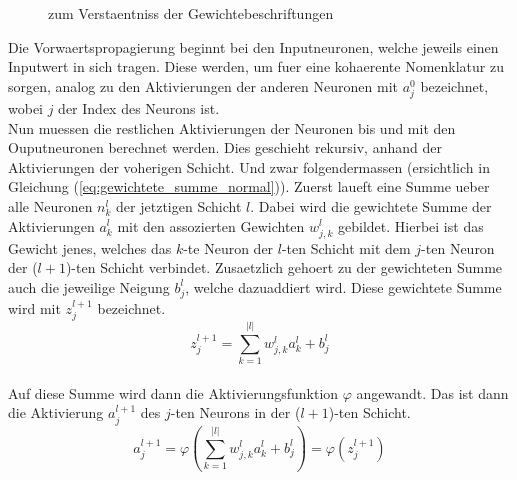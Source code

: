\para{}
\begin{figure}[h!]
  \centering
  \label{fig:nomenklatur2}
  \caption{zum Verstaentniss der Gewichtebeschriftungen}
\end{figure}
\para{}
Die Vorwaertspropagierung beginnt bei den Inputneuronen, welche jeweils
einen Inputwert in sich tragen. Diese werden, um fuer eine kohaerente Nomenklatur zu sorgen,
analog zu den Aktivierungen der anderen Neuronen mit $a_j^0$ bezeichnet, wobei
$j$ der Index des Neurons ist. \\
Nun muessen die restlichen Aktivierungen der Neuronen bis und mit den Ouputneuronen berechnet werden. Dies geschieht rekursiv, anhand der
Aktivierungen der voherigen Schicht. Und zwar folgendermassen (ersichtlich in
Gleichung (\ref{eq:gewichtete_summe_normal})).
\para{}
Zuerst laueft eine Summe ueber alle Neuronen $n_k^{l}$ der jetztigen Schicht
$l$. Dabei wird die gewichtete Summe der Aktivierungen $a_k^{l}$ mit den
assozierten Gewichten $w_{j,k}^l$ gebildet. Hierbei ist das Gewicht jenes, welches das
$k$-te Neuron der $l$-ten Schicht mit dem $j$-ten Neuron der ($l+1$)-ten Schicht verbindet.
Zusaetzlich gehoert zu der gewichteten Summe auch die jeweilige Neigung $b_j^l$, welche
dazuaddiert wird. Diese gewichtete Summe wird mit $z_j^{l+1}$ bezeichnet.
\\
\begin{equation}\tag{FP1}\label{eq:gewichtete_summe_normal}
  z_j^{l+1} = \sum_{k=1}^{|l|} w_{j,k}^l a_k^l + b_j^l
\end{equation}
\\
Auf diese Summe wird dann die Aktivierungsfunktion $\varphi$ angewandt.
Das ist dann die Aktivierung $a_j^{l+1}$ des $j$-ten Neurons in der ($l+1$)-ten Schicht.
\\
\begin{equation}\tag{FP2}\label{eq:aktivierung_normal}
  a_j^{l+1} = \varphi\left(\sum_{k=1}^{|l|} w_{j,k}^l a_k^{l} + b_j^l \right) = \varphi \left( z_j^{l+1} \right)
\end{equation}
